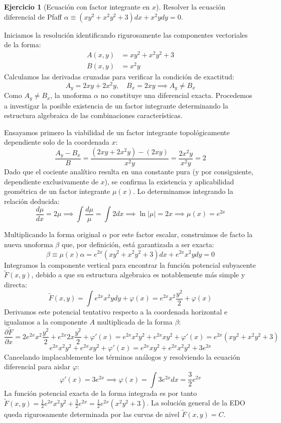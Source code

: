 \documentclass[11pt,a4paper]{article}
\theoremstyle{definition}
\newtheorem{exercise}{Ejercicio}[section]
\theoremstyle{plain}
\begin{document}
\begin{exercise}[Ecuación con factor integrante en $x$]
Resolver la ecuación diferencial de Pfaff $\alpha \equiv (xy^2 + x^2y^2 + 3)dx + x^2y dy = 0$.
\end{exercise}

\begin{tcolorbox}
Iniciamos la resolución identificando rigurosamente las componentes vectoriales de la forma:
\begin{align*}
    A(x,y) &= xy^2 + x^2y^2 + 3 \\
    B(x,y) &= x^2y 
\end{align*}
Calculamos las derivadas cruzadas para verificar la condición de exactitud:
$$ A_y = 2xy + 2x^2y, \quad B_x = 2xy \implies A_y \neq B_x $$
Como $A_y \neq B_x$, la unoforma $\alpha$ no constituye una diferencial exacta. Procedemos a investigar la posible existencia de un factor integrante determinando la estructura algebraica de las combinaciones características.

Ensayamos primero la viabilidad de un factor integrante topológicamente dependiente solo de la coordenada $x$:
$$ \frac{A_y - B_x}{B} = \frac{(2xy + 2x^2y) - (2xy)}{x^2y} = \frac{2x^2y}{x^2y} = 2 $$
Dado que el cociente analítico resulta en una constante pura (y por consiguiente, dependiente exclusivamente de $x$), se confirma la existencia y aplicabilidad geométrica de un factor integrante $\mu(x)$. Lo determinamos integrando la relación deducida:
$$ \frac{d\mu}{dx} = 2\mu \implies \int \frac{d\mu}{\mu} = \int 2 dx \implies \ln|\mu| = 2x \implies \mu(x) = e^{2x} $$

Multiplicando la forma original $\alpha$ por este factor escalar, construimos de facto la nueva unoforma $\beta$ que, por definición, está garantizada a ser exacta:
$$ \beta \equiv \mu(x)\alpha = e^{2x}(xy^2 + x^2y^2 + 3)dx + e^{2x}x^2y dy = 0 $$
Integramos la componente vertical para encontrar la función potencial subyacente $\tilde{F}(x,y)$, debido a que su estructura algebraica es notablemente más simple y directa:
$$ \tilde{F}(x,y) = \int e^{2x}x^2y dy + \varphi(x) = e^{2x}x^2 \frac{y^2}{2} + \varphi(x) $$
Derivamos este potencial tentativo respecto a la coordenada horizontal e igualamos a la componente $A$ multiplicada de la forma $\beta$:
$$ \frac{\partial \tilde{F}}{\partial x} = 2e^{2x}x^2 \frac{y^2}{2} + e^{2x}2x \frac{y^2}{2} + \varphi'(x) = e^{2x}x^2y^2 + e^{2x}xy^2 + \varphi'(x) = e^{2x}(xy^2 + x^2y^2 + 3) $$
$$ e^{2x}x^2y^2 + e^{2x}xy^2 + \varphi'(x) = e^{2x}xy^2 + e^{2x}x^2y^2 + 3e^{2x} $$
Cancelando implacablemente los términos análogos y resolviendo la ecuación diferencial para aislar $\varphi$:
$$ \varphi'(x) = 3e^{2x} \implies \varphi(x) = \int 3e^{2x} dx = \frac{3}{2}e^{2x} $$
La función potencial exacta de la forma integrada es por tanto $\tilde{F}(x,y) = \frac{1}{2}e^{2x}x^2y^2 + \frac{3}{2}e^{2x} = \frac{1}{2}e^{2x}(x^2y^2 + 3)$.
La solución general de la EDO queda rigurosamente determinada por las curvas de nivel $\tilde{F}(x,y) = C$.


\end{tcolorbox}
\end{document}
